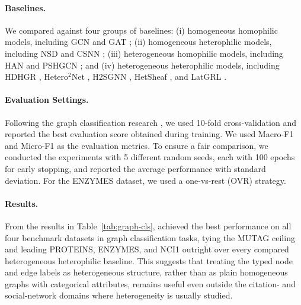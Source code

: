 \paragraph{Baselines.} We compared \method{} against four groups of baselines: (i) homogeneous homophilic models, including GCN \cite{kipf2017gcn} and GAT \cite{velickovic2018gat}; (ii) homogeneous heterophilic models, including NSD \cite{bodnar2022neural} and CSNN \cite{ribeiro2026cooperative}; (iii) heterogeneous homophilic models, including HAN \cite{wang2019han} and PSHGCN \cite{he2024spectral}; and (iv) heterogeneous heterophilic models, including HDHGR \cite{guo2023homophily}, Hetero$^2$Net \cite{li2025hetero2net}, H2SGNN \cite{lu2026addressing}, HetSheaf \cite{braithwaite2024heterogeneous}, and LatGRL \cite{shen2025heterophily}.

\paragraph{Evaluation Settings.} Following the graph classification research \cite{zhang2018end, amouzad2024graphunet}, we used 10-fold cross-validation and reported the best evaluation score obtained during training. We used Macro-F1 and Micro-F1 as the evaluation metrics. To ensure a fair comparison, we conducted the experiments with 5 different random seeds, each with 100 epochs for early stopping, and reported the average performance with standard deviation. For the ENZYMES dataset, we used a one-vs-rest (OVR) strategy.

\paragraph{Results.}

From the results in Table~\ref{tab:graph-cls}, \method{} achieved the best performance on all four benchmark datasets in graph classification tasks, tying the MUTAG ceiling and leading PROTEINS, ENZYMES, and NCI1 outright over every compared heterogeneous heterophilic baseline. This suggests that treating the typed node and edge labels as heterogeneous structure, rather than as plain homogeneous graphs with categorical attributes, remains useful even outside the citation- and social-network domains where heterogeneity is usually studied.


